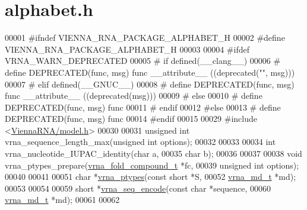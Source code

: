 \hypertarget{alphabet_8h_source}{}\section{alphabet.\+h}
\label{alphabet_8h_source}

\begin{DoxyCode}
00001 \textcolor{preprocessor}{#ifndef VIENNA\_RNA\_PACKAGE\_ALPHABET\_H}
00002 \textcolor{preprocessor}{#define VIENNA\_RNA\_PACKAGE\_ALPHABET\_H}
00003 
00004 \textcolor{preprocessor}{#ifdef VRNA\_WARN\_DEPRECATED}
00005 \textcolor{preprocessor}{# if defined(\_\_clang\_\_)}
00006 \textcolor{preprocessor}{#  define DEPRECATED(func, msg) func \_\_attribute\_\_ ((deprecated("", msg)))}
00007 \textcolor{preprocessor}{# elif defined(\_\_GNUC\_\_)}
00008 \textcolor{preprocessor}{#  define DEPRECATED(func, msg) func \_\_attribute\_\_ ((deprecated(msg)))}
00009 \textcolor{preprocessor}{# else}
00010 \textcolor{preprocessor}{#  define DEPRECATED(func, msg) func}
00011 \textcolor{preprocessor}{# endif}
00012 \textcolor{preprocessor}{#else}
00013 \textcolor{preprocessor}{# define DEPRECATED(func, msg) func}
00014 \textcolor{preprocessor}{#endif}
00015 
00029 \textcolor{preprocessor}{#include <\hyperlink{model_8h}{ViennaRNA/model.h}>}
00030 
00031 \textcolor{keywordtype}{unsigned} \textcolor{keywordtype}{int} vrna\_sequence\_length\_max(\textcolor{keywordtype}{unsigned} \textcolor{keywordtype}{int} options);
00032 
00033 
00034 \textcolor{keywordtype}{int} vrna\_nucleotide\_IUPAC\_identity(\textcolor{keywordtype}{char} a,
00035                                    \textcolor{keywordtype}{char} b);
00036 
00037 
00038 \textcolor{keywordtype}{void} vrna\_ptypes\_prepare(\hyperlink{group__fold__compound_structvrna__fc__s}{vrna\_fold\_compound\_t} *fc,
00039                          \textcolor{keywordtype}{unsigned} \textcolor{keywordtype}{int}         options);
00040 
00041 
00051 \textcolor{keywordtype}{char} *\hyperlink{group__alphabet__utils_ga51a9e86a5f731f5f2f5584ee67cee4a8}{vrna\_ptypes}(\textcolor{keyword}{const} \textcolor{keywordtype}{short} *S,
00052                   \hyperlink{group__model__details_structvrna__md__s}{vrna\_md\_t}   *md);
00053 
00054 
00059 \textcolor{keywordtype}{short} *\hyperlink{group__alphabet__utils_ga636e7d6f888fd639587296a5eddea660}{vrna\_seq\_encode}(\textcolor{keyword}{const} \textcolor{keywordtype}{char} *sequence,
00060                        \hyperlink{group__model__details_structvrna__md__s}{vrna\_md\_t}  *md);
00061 
00062 

\end{DoxyCode}
